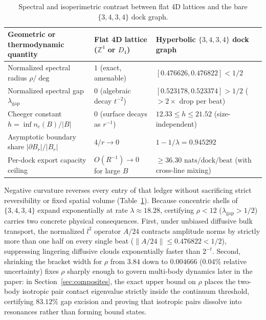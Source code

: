 \begin{table}[tb]
\centering
\caption{Spectral and isoperimetric contrast between flat 4D lattices and the bare $\{3,4,3,4\}$ dock graph.}
\label{tab:flat-vs-hyperbolic}
\footnotesize
\begin{tabularx}{\textwidth}{@{}>{\raggedright\arraybackslash}p{4.35cm}>{\raggedright\arraybackslash}p{3.95cm}>{\raggedright\arraybackslash}X@{}}
\toprule
Geometric or thermodynamic quantity & Flat 4D lattice ($\mathbb{Z}^4$ or $D_4$) & Hyperbolic $\{3,4,3,4\}$ dock graph \\
\midrule
Normalized spectral radius $\rho / \deg$ & $1$ (exact, amenable) & $[0.476626, 0.476822] < 1/2$ \\
Normalized spectral gap $\lambda_{\mathrm{gap}}$ & $0$ (algebraic decay $t^{-2}$) & $[0.523178, 0.523374] > 1/2$ ($> 2\times$ drop per beat) \\
Cheeger constant $h = \inf n_c(B)/|B|$ & $0$ (surface decays as $r^{-1}$) & $12.33 \le h \le 21.52$ (size-independent) \\
Asymptotic boundary share $|\partial B_r|/|B_r|$ & $4/r \to 0$ & $1 - 1/\lambda = 0.945292$ \\
Per-dock export capacity ceiling & $O(R^{-1}) \to 0$ for large $B$ & $\ge 36.30\text{ nats/dock/beat}$ (with cross-line mixing) \\
\bottomrule
\end{tabularx}
\end{table}

Negative curvature reverses every entry of that ledger without sacrificing strict reversibility or fixed spatial volume
(Table~\ref{tab:flat-vs-hyperbolic}). Because concentric shells of $\{3,4,3,4\}$ expand exponentially at rate
$\lambda \approx 18.28$, certifying $\rho < 12$ ($\lambda_{\mathrm{gap}} > 1/2$) carries two concrete physical
consequences. First, under unbiased diffusive bulk transport, the normalized $l^2$ operator $A/24$ contracts amplitude
norms by strictly more than one half on every single beat ($\|A/24\| \le 0.476822 < 1/2$), suppressing lingering
diffusive clouds exponentially faster than $2^{-t}$. Second, shrinking the bracket width for $\rho$ from $3.84$ down to
$0.004666$ ($0.04\%$ relative uncertainty) fixes $\rho$ sharply enough to govern multi-body dynamics later in the paper:
in Section~\ref{sec:composites}, the exact upper bound on $\rho$ places the two-body isotropic pair contact eigenvalue
strictly inside the continuum threshold, certifying $83.12\%$ gap excision and proving that isotropic pairs dissolve
into resonances rather than forming bound states.

